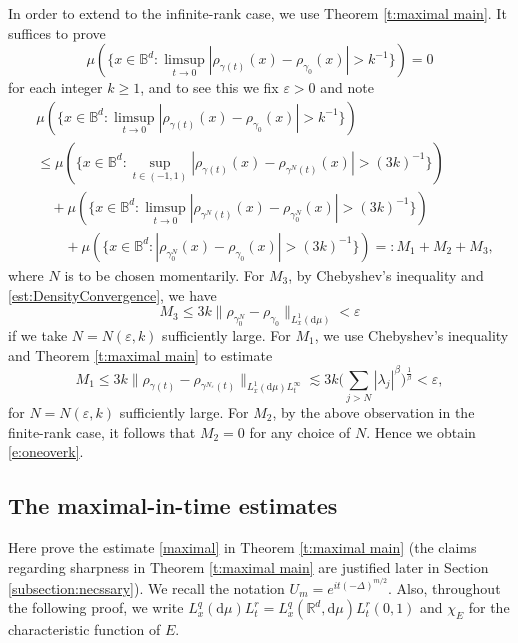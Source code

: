 \documentclass[a4paper]{amsart}
\numberwithin{equation}{section}%
\theoremstyle{plain}%
\theoremstyle{definition}
\theoremstyle{remark}%
\def\d{\mathrm{d}}
\begin{document}
In order to extend to the infinite-rank case, we use Theorem \ref{t:maximal main}. It suffices to prove
\begin{equation} \label{e:oneoverk}
\mu(\{x\in \mathbb{B}^d:\limsup_{t\to 0}|\rho_{\gamma(t)}(x)-\rho_{\gamma_0}(x)|> k^{-1}\}) = 0
\end{equation}
for each integer $k \geq 1$, and to see this we fix $\varepsilon > 0$ and note
\begin{align*}
    &
    \mu(\{x\in \mathbb{B}^d:\limsup_{t\to 0}|\rho_{\gamma(t)}(x)-\rho_{\gamma_0}(x)|>k^{-1}\})\\
    &\leq
    \mu(\{x\in\mathbb{B}^d:\sup_{t \in (-1,1)}|\rho_{\gamma(t)}(x)-\rho_{\gamma^{N}(t)}(x)|>(3k)^{-1}\})\\
    &\quad+
    \mu(\{x\in\mathbb{B}^d:\limsup_{t\to 0}|\rho_{\gamma^{N}(t)}(x)-\rho_{\gamma_0^{N}}(x)|>(3k)^{-1}\})\\
    &\qquad+
    \mu(\{x\in\mathbb{B}^d: |\rho_{\gamma_0^{N}}(x)-\rho_{\gamma_0}(x)|>(3k)^{-1}\}) =: M_1 + M_2 + M_3,
\end{align*}
where $N$ is to be chosen momentarily. For $M_3$, by Chebyshev's inequality and \eqref{est:DensityConvergence}, we have
\[
M_3 \leq 3k \| \rho_{\gamma_0^{N}}-\rho_{\gamma_0}\|_{L_x^{1}(\d\mu)} < \varepsilon
\]
if we take $N = N(\varepsilon,k)$ sufficiently large. For $M_1$, we use Chebyshev's inequality and Theorem \ref{t:maximal main} to estimate
\[
M_1 \leq 3k \|\rho_{\gamma(t)}-\rho_{\gamma^{N_\varepsilon}(t)}\|_{L_x^{1}(\d\mu)L_t^\infty} \lesssim 3k \bigg(\sum_{j > N} |\lambda_j|^\beta \bigg)^{\frac{1}{\beta}} < \varepsilon,
\]
for $N= N(\varepsilon,k)$ sufficiently large. For $M_2$, by the above observation in the finite-rank case, it follows that $M_2 = 0$ for any choice of $N$. Hence we obtain \eqref{e:oneoverk}.





\subsection{The maximal-in-time estimates}
Here prove the estimate \eqref{maximal} in Theorem  \ref{t:maximal main} (the claims regarding sharpness in Theorem \ref{t:maximal main} are justified later in Section \ref{subsection:necssary}). We recall the notation $U_m=e^{it(-\Delta)^{m/2}}$. Also, throughout the following proof, we write $L_x^q(\d\mu)L_t^r = L_x^q(\mathbb R^d,\d\mu)L_t^r(0,1)$ and $\chi_E$ for the characteristic function of $E$.
\end{document}
